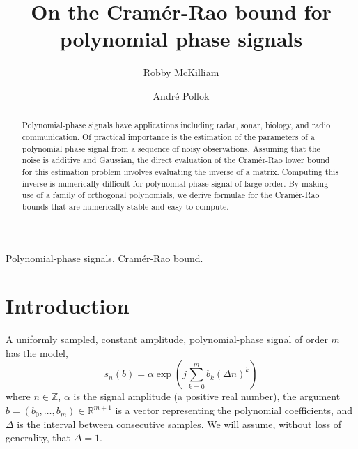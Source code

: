 \documentclass[review]{elsarticle}
\newcommand{\reals}{{\mathbb R}}
\newcommand{\ints}{{\mathbb Z}}
\begin{document}
\begin{frontmatter}

\title{On the Cram\'{e}r-Rao bound for polynomial phase signals}

\author{Robby McKilliam} 
\author{Andr\'{e} Pollok}
\address{Institute for Telecommunications Research, The University of South Australia, SA, 5095}


 


\begin{abstract}
Polynomial-phase signals have applications including radar, sonar, biology, and radio communication.  Of practical importance is the estimation of the parameters of a polynomial phase signal from a sequence of noisy observations.  Assuming that the noise is additive and Gaussian, the direct evaluation of the Cram\'{e}r-Rao lower bound for this estimation problem involves evaluating the inverse of a matrix.  Computing this inverse is numerically difficult for polynomial phase signal of large order.  By making use of a family of orthogonal polynomials, we derive formulae for the Cram\'{e}r-Rao bounds that are numerically stable and easy to compute.
\end{abstract}

\begin{keyword}
Polynomial-phase signals, Cram\'{e}r-Rao bound.
\end{keyword}


\end{frontmatter}

\section{Introduction}

A uniformly sampled, constant amplitude, polynomial-phase signal of order $m$ has the model,
\begin{equation}\label{eq:polyestfunction}
s_n(b) = \alpha \exp\left( j \sum_{k = 0}^{m}{b_k (\Delta n)^k}\right)
\end{equation}
where $n \in \ints$, $\alpha$ is the signal amplitude (a positive real number), the argument $b=(b_0, \dots, b_m)\in\reals^{m+1}$ is a vector representing the polynomial coefficients,  and $\Delta$ is the interval between consecutive samples.  We will assume, without loss of generality, that $\Delta = 1$.
\end{document}
